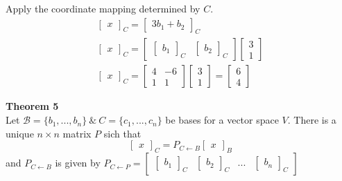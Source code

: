\documentclass{article}
\begin{document}
  Apply the coordinate mapping determined by $ C $.
  \[
      \begin{gathered}
      \begin{bmatrix}
          x
      \end{bmatrix}_{C} = \begin{bmatrix}
          3b_{1}+b_{2}  
      \end{bmatrix}_{C}\\
      \begin{bmatrix}
          x
      \end{bmatrix}_{C}= 
      \begin{bmatrix}
          \begin{bmatrix}
              b_{1} 
          \end{bmatrix}_{C}

      &\begin{bmatrix}
          b_{2} 
      \end{bmatrix}_{C}
      \end{bmatrix}
      \begin{bmatrix}
          3\\
          1
      \end{bmatrix}\\
      \begin{bmatrix}
          x
      \end{bmatrix}_{C} =
      \begin{bmatrix}
          4 &-6\\
          1 &1
      \end{bmatrix}
      \begin{bmatrix}
          3\\
          1
      \end{bmatrix}=
      \boxed{\begin{bmatrix}
          6\\
          4
      \end{bmatrix}}
      \end{gathered}
  \]
  
  \textbf{Theorem 5}\\
  Let $ \mathcal{B} = \{ b_{1},...,b_{n} \} ~\&~ C=\{ c_{1},...,c_{n} \} $ be bases for a vector space $ V $. There is a unique $ n \times n $ matrix $ P $ sich that
  \[
      \begin{bmatrix}
          x
      \end{bmatrix}_{C}= P_{C \leftarrow B} \begin{bmatrix}
          x
      \end{bmatrix}_{B}   
  \]
  and $ P_{C \leftarrow B}  $ is given by $ P_{C \leftarrow P}  = \begin{bmatrix}
      \begin{bmatrix}
          b_{1} 
      \end{bmatrix}_{C} &\begin{bmatrix}
          b_{2} 
      \end{bmatrix}_{C} &...
      &\begin{bmatrix}
          b_{n} 
      \end{bmatrix}_{C} 
  \end{bmatrix} $ 
  
\end{document}
